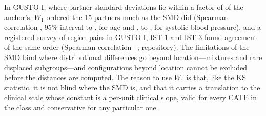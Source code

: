 \documentclass[AMA,Times1COL]{WileyNJDv5}
\begin{document}
In GUSTO-I, where partner standard deviations lie within a factor of  of the anchor's, $W_1$ ordered the 15 partners much as the SMD did (Spearman correlation , 95\% interval  to , for age and ,  to , %
for systolic blood pressure), and a registered survey of region pairs in GUSTO-I, IST-1\cite{ist1_2000} and IST-3\cite{ist3_2012} found agreement of the same order (Spearman correlation --; repository). The limitations of the SMD bind where distributional differences go beyond location---mixtures and rare displaced subgroups---and configurations beyond location cannot be excluded before the distances are computed. The reason to use $W_1$ is that, like the KS statistic, it is not blind where the SMD is, and that it carries a translation to the clinical scale whose constant is a per-unit clinical slope, valid for every CATE in the class and conservative for any particular one.

\end{document}
